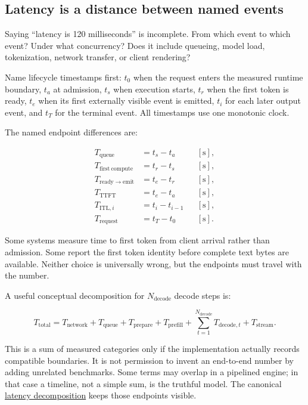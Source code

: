 \documentclass[
  10pt,
]{article}
\begin{document}
\subsection{Latency is a distance between named
events}\label{latency-is-a-distance-between-named-events}

Saying ``latency is 120 milliseconds'' is incomplete. From which event
to which event? Under what concurrency? Does it include queueing, model
load, tokenization, network transfer, or client rendering?

Name lifecycle timestamps first: \(t_0\) when the request enters the
measured runtime boundary, \(t_a\) at admission, \(t_s\) when execution
starts, \(t_r\) when the first token is ready, \(t_e\) when its first
externally visible event is emitted, \(t_i\) for each later output
event, and \(t_T\) for the terminal event. All timestamps use one
monotonic clock.

The named endpoint differences are:

\[
\begin{aligned}
T_{\mathrm{queue}} &= t_s-t_a && [\mathrm{s}],\\
T_{\mathrm{first\ compute}} &= t_r-t_s && [\mathrm{s}],\\
T_{\mathrm{ready\to emit}} &= t_e-t_r && [\mathrm{s}],\\
T_{\mathrm{TTFT}} &= t_e-t_a && [\mathrm{s}],\\
T_{\mathrm{ITL},i} &= t_i-t_{i-1} && [\mathrm{s}],\\
T_{\mathrm{request}} &= t_T-t_0 && [\mathrm{s}].
\end{aligned}
\]

Some systems measure time to first token from client arrival rather than
admission. Some report the first token identity before complete text
bytes are available. Neither choice is universally wrong, but the
endpoints must travel with the number.

A useful conceptual decomposition for \(N_{\mathrm{decode}}\) decode
steps is:

\[
T_{\mathrm{total}}
=T_{\mathrm{network}}+T_{\mathrm{queue}}+T_{\mathrm{prepare}}
+T_{\mathrm{prefill}}
+\sum_{t=1}^{N_{\mathrm{decode}}}T_{\mathrm{decode},t}
+T_{\mathrm{stream}}.
\]

This is a sum of measured categories only if the implementation actually
records compatible boundaries. It is not permission to invent an
end-to-end number by adding unrelated benchmarks. Some terms may overlap
in a pipelined engine; in that case a timeline, not a simple sum, is the
truthful model. The canonical
\href{https://github.com/hermonai/inside-the-llm-engine/blob/astra-visual-rewrite/diagrams/runtime/latency-decomposition.txt}{latency
decomposition} keeps those endpoints visible.
\end{document}
